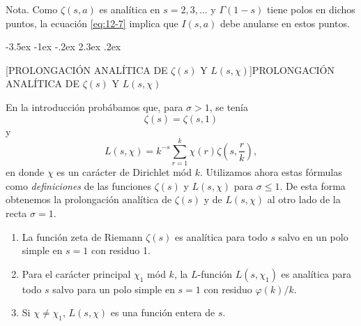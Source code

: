 \documentclass[12pt,a4paper]{book}
\makeatletter
\renewcommand\section{\@startsection{section}{1}{\z@}%
  {-3.5ex \@plus -1ex \@minus -.2ex}%
  {2.3ex \@plus .2ex}%
  {\normalfont\Large\bfseries\raggedright}}
\makeatother
\begin{document}
    Nota. Como $\zeta(s,a)$ es analítica en $s=2,3,\dots$ y $\Gamma(1-s)$ tiene polos en
    dichos puntos, la ecuación \eqref{eq:12-7} implica que $I(s,a)$ debe anularse en estos
    puntos.

    \section[PROLONGACIÓN ANALÍTICA DE \texorpdfstring{$\zeta(s)$}{ζ(s)} Y \texorpdfstring{$L(s,\chi)$}{L(s,χ)}]{PROLONGACIÓN ANALÍTICA DE \texorpdfstring{$\zeta(s)$}{ζ(s)} Y \texorpdfstring{$L(s,\chi)$}{L(s,χ)}}

    En la introducción probábamos que, para $\sigma>1$, se tenía
    \begin{equation*}
        \zeta(s)=\zeta(s,1)
    \end{equation*}
    y
    \begin{equation}\label{eq:12-8}
        L(s,\chi)=k^{-s}\sum_{r=1}^{k}\chi(r)\zeta\left(s,\frac{r}{k}\right),
    \end{equation}
    en donde $\chi$ es un carácter de Dirichlet mód $k$. Utilizamos ahora estas fórmulas como
    \textit{definiciones} de las funciones $\zeta(s)$ y $L(s,\chi)$ para $\sigma\leq1$. De
    esta forma obtenemos la prolongación analítica de $\zeta(s)$ y de $L(s,\chi)$ al otro lado
    de la recta $\sigma=1$.

    \begin{teorema}\label{teo:12-5}
        \begin{enumerate}
            \item[(a)] La función zeta de Riemann $\zeta(s)$ es analítica para todo $s$ salvo en
            un polo simple en $s=1$ con residuo 1.
            \item[(b)] Para el carácter principal $\chi_{1}$ mód $k$, la $L$-función $L(s,\chi_{1})$
            es analítica para todo $s$ salvo para un polo simple en $s=1$ con residuo
            $\varphi(k)/k$.
            \item[(c)] Si $\chi\neq\chi_{1}$, $L(s,\chi)$ es una función entera de $s$.
        \end{enumerate}
    \end{teorema}
\end{document}
